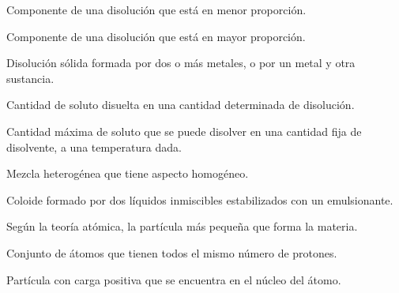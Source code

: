 \begin{vocabulary}
    Componente de una disolución que está en menor proporción.
\end{vocabulary}

\begin{vocabulary}
    Componente de una disolución que está en mayor proporción.
\end{vocabulary}

\begin{vocabulary}
    Disolución sólida formada por dos o más metales, o por un metal y otra sustancia.
\end{vocabulary}

\begin{vocabulary}
    Cantidad de soluto disuelta en una cantidad determinada de disolución.
\end{vocabulary}

\begin{vocabulary}
    Cantidad máxima de soluto que se puede disolver en una cantidad fija de disolvente, a una temperatura dada.
\end{vocabulary}

\begin{vocabulary}
    Mezcla heterogénea que tiene aspecto homogéneo.
\end{vocabulary}

\begin{vocabulary}
    Coloide formado por dos líquidos inmiscibles estabilizados con un emulsionante.
\end{vocabulary}

\begin{vocabulary}
    Según la teoría atómica, la partícula más pequeña que forma la materia.
\end{vocabulary}

\begin{vocabulary}
    Conjunto de átomos que tienen todos el mismo número de protones.
\end{vocabulary}

\begin{vocabulary}
    Partícula con carga positiva que se encuentra en el núcleo del átomo.
\end{vocabulary}

